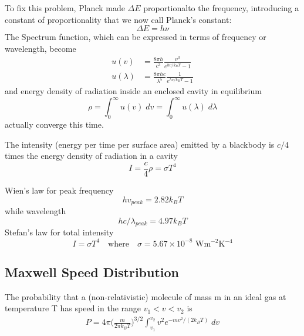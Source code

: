 \documentclass[../../main.tex]{subfiles}
\begin{document}
To fix this problem, Planck made $\Delta E$ proportionalto the frequency, introducing a constant of proportionality that we now call Planck's constant:
\begin{equation*}
    \Delta E= h\nu
\end{equation*}
The Spectrum function, which can be expressed in terms of frequency or wavelength, become
\begin{align*}
    u(v)&=\frac{8\pi h}{c^3}\frac{v^3}{e^{hv/k_BT}-1}\\
    u(\lambda)&=\frac{8\pi hc}{\lambda^5}\frac{1}{e^{hc/k_BT}-1}
\end{align*}
and energy density of radiation inside an enclosed cavity in equilibrium
\begin{equation*}
    \rho=\int_{0}^{\infty}u(v)\;dv=\int_{0}^{\infty}u(\lambda)\;d\lambda
\end{equation*}
actually converge this time.

The intensity (energy per time per surface area) emitted by a blackbody is $c/4 $times the energy density of radiation in a cavity
\begin{equation*}
    I=\frac{c}{4}\rho=\sigma T^4
\end{equation*}

Wien's law for peak frequency
\begin{equation*}
    hv_{peak} = 2.82 k_B T
\end{equation*}
while wavelength
\begin{equation*}
    hc/\lambda_{peak} = 4.97 k_B T
\end{equation*}
Stefan's law for total intensity 
\begin{equation*}
    I=\sigma T^4\quad\text{where}\quad \sigma= 5.67 \times 10^{-8} \text{ Wm$^{-2}$K$^{-4}$}
\end{equation*}

\subsection{Maxwell Speed Distribution}
The probability that a (non-relativistic) molecule of mass m in an ideal gas at temperature T has speed in the range $v_1 < v < v_2$ is
\begin{eqnarray}
    P=4\pi \biggl(\frac{m}{2\pi k_BT}\biggr)^{3/2} \int_{v_1}^{v_2}v^2e^{-mv^2/(2k_B T)}\;dv
\end{eqnarray}
\end{document}
